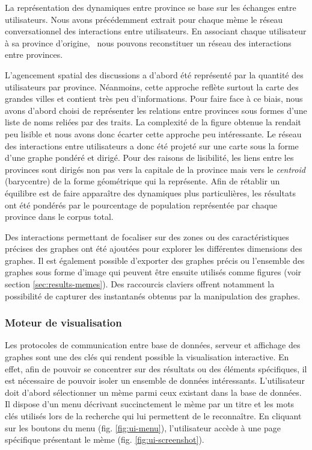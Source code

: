    La représentation des dynamiques entre province se base sur les échanges entre utilisateurs. Nous avons précédemment extrait pour chaque mème le réseau conversationnel des interactions entre utilisateurs. En associant chaque utilisateur à sa province d{\textquoteright}origine, \ nous pouvons reconstituer un réseau des interactions entre provinces. 

    L'agencement spatial des discussions a d'abord été représenté par la quantité des utilisateurs par province. Néanmoins, cette approche reflète surtout la carte des grandes villes et contient très peu d'informations. Pour faire face à ce biais, nous avons d'abord choisi de représenter les relations entre provinces sous formes d'une liste de noms reliées par des traits. La complexité de la figure obtenue la rendait peu lisible et nous avons donc écarter cette approche peu intéressante. Le réseau des interactions entre utilisateurs a donc été projeté sur une carte sous la forme d{\textquoteright}une graphe pondéré et dirigé. Pour des raisons de lisibilité, les liens entre les provinces sont dirigés non pas vers la capitale de la province mais vers le \textit{centroid} (barycentre) de la forme géométrique qui la représente. Afin de rétablir un équilibre est de faire appara\^itre des dynamiques plus particuli\`eres, les résultats ont été pondérés par le pourcentage de population représentée par chaque province dans le corpus total.

    Des interactions permettant de focaliser sur des zones ou des caractéristiques précises des graphes ont été ajoutées pour explorer les différentes dimensions des graphes. Il est également possible d'exporter des graphes précis ou l'ensemble des graphes sous forme d'image qui peuvent être ensuite utilisés comme figures (voir section \ref{sec:results-memes}). Des raccourcis claviers offrent notamment la possibilité de capturer des instantanés obtenus par la manipulation des graphes.
    
\subsubsection{Moteur de visualisation} 
\label{sec:moteur_de_visualisation}

    Les protocoles de communication entre base de données, serveur et affichage des graphes sont une des clés qui rendent possible la visualisation interactive. En effet, afin de pouvoir se concentrer sur des résultats ou des éléments spécifiques, il est nécessaire de pouvoir isoler un ensemble de données intéressants. L'utilisateur doit d'abord sélectionner un mème parmi ceux existant dans la base de données. Il dispose d'un menu décrivant succinctement le mème par un titre et les mots clés utilisés lors de la recherche qui lui permettent de le reconnaître. En cliquant sur les boutons du menu (fig. \ref{fig:ui-menu}), l'utilisateur accède à une page spécifique présentant le mème (fig. \ref{fig:ui-screenshot}).

